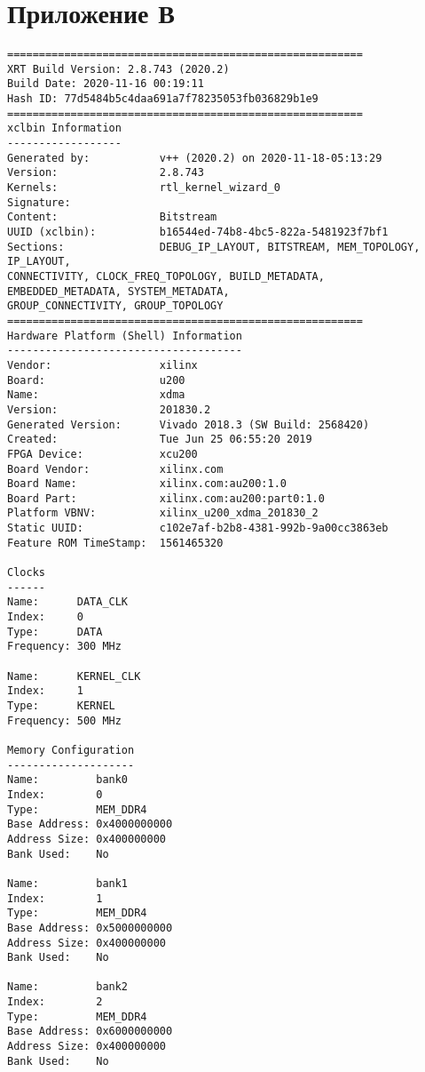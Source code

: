 \chapter*{Приложение В}

\begin{lstlisting}[label=lst:code_3,caption=Содержимое файла  vinc\_xclbin\_info]
========================================================
XRT Build Version: 2.8.743 (2020.2)
Build Date: 2020-11-16 00:19:11
Hash ID: 77d5484b5c4daa691a7f78235053fb036829b1e9
========================================================
xclbin Information
------------------
Generated by:           v++ (2020.2) on 2020-11-18-05:13:29
Version:                2.8.743
Kernels:                rtl_kernel_wizard_0
Signature:              
Content:                Bitstream
UUID (xclbin):          b16544ed-74b8-4bc5-822a-5481923f7bf1
Sections:               DEBUG_IP_LAYOUT, BITSTREAM, MEM_TOPOLOGY, IP_LAYOUT, 
CONNECTIVITY, CLOCK_FREQ_TOPOLOGY, BUILD_METADATA, 
EMBEDDED_METADATA, SYSTEM_METADATA, 
GROUP_CONNECTIVITY, GROUP_TOPOLOGY
========================================================
Hardware Platform (Shell) Information
-------------------------------------
Vendor:                 xilinx
Board:                  u200
Name:                   xdma
Version:                201830.2
Generated Version:      Vivado 2018.3 (SW Build: 2568420)
Created:                Tue Jun 25 06:55:20 2019
FPGA Device:            xcu200
Board Vendor:           xilinx.com
Board Name:             xilinx.com:au200:1.0
Board Part:             xilinx.com:au200:part0:1.0
Platform VBNV:          xilinx_u200_xdma_201830_2
Static UUID:            c102e7af-b2b8-4381-992b-9a00cc3863eb
Feature ROM TimeStamp:  1561465320

Clocks
------
Name:      DATA_CLK
Index:     0
Type:      DATA
Frequency: 300 MHz

Name:      KERNEL_CLK
Index:     1
Type:      KERNEL
Frequency: 500 MHz

Memory Configuration
--------------------
Name:         bank0
Index:        0
Type:         MEM_DDR4
Base Address: 0x4000000000
Address Size: 0x400000000
Bank Used:    No

Name:         bank1
Index:        1
Type:         MEM_DDR4
Base Address: 0x5000000000
Address Size: 0x400000000
Bank Used:    No

Name:         bank2
Index:        2
Type:         MEM_DDR4
Base Address: 0x6000000000
Address Size: 0x400000000
Bank Used:    No


\end{lstlisting}

